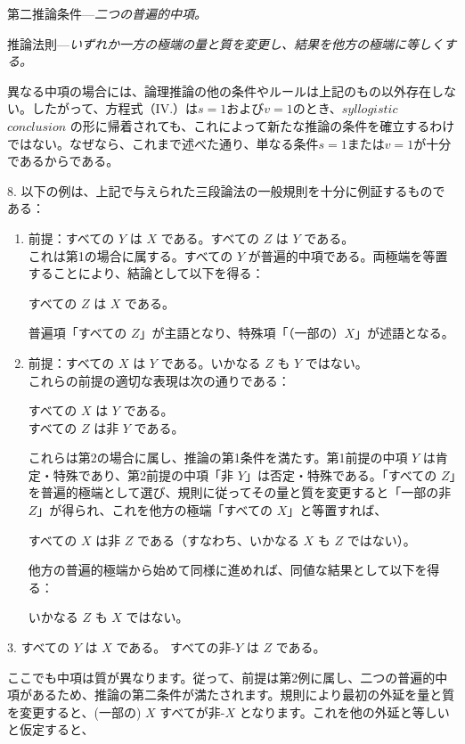 \documentclass[a4paper,11pt,openany]{ltjsbook}
\begin{document}
\textsc{第二推論条件}---\emph{二つの普遍的中項。}

\textsc{推論法則}---\emph{いずれか一方の極端の量と質を変更し、結果を他方の極端に等しくする。}

異なる中項の場合には、論理推論の他の条件やルールは上記のもの以外存在しない。したがって、方程式（IV.）は$s=1$および$v = 1$のとき、$syllogistic$ $conclusion$ の形に帰着されても、これによって新たな推論の条件を確立するわけではない。なぜなら、これまで述べた通り、単なる条件$s = 1$または$v = 1$が十分であるからである。

8. 以下の例は、上記で与えられた三段論法の一般規則を十分に例証するものである：
\begin{enumerate}[label=\textbf{\arabic*.}]
\item 前提：すべての $Y$ は $X$ である。すべての $Z$ は $Y$ である。\\
これは第1の場合に属する。すべての $Y$ が普遍的中項である。両極端を等置することにより、結論として以下を得る：
\begin{center}
すべての $Z$ は $X$ である。
\end{center}
普遍項「すべての $Z$」が主語となり、特殊項「（一部の）$X$」が述語となる。

\item 前提：すべての $X$ は $Y$ である。いかなる $Z$ も $Y$ ではない。\\
これらの前提の適切な表現は次の通りである：
\begin{center}
すべての $X$ は $Y$ である。\\
すべての $Z$ は非 $Y$ である。
\end{center}
これらは第2の場合に属し、推論の第1条件を満たす。第1前提の中項 $Y$ は肯定・特殊であり、第2前提の中項「非 $Y$」は否定・特殊である。「すべての $Z$」を普遍的極端として選び、規則に従ってその量と質を変更すると「一部の非 $Z$」が得られ、これを他方の極端「すべての $X$」と等置すれば、
\begin{center}
すべての $X$ は非 $Z$ である（すなわち、いかなる $X$ も $Z$ ではない）。
\end{center}
他方の普遍的極端から始めて同様に進めれば、同値な結果として以下を得る：
\begin{center}
いかなる $Z$ も $X$ ではない。
\end{center}
\end{enumerate}

3. すべての $Y$ は $X$ である。
   すべての非-$Y$ は $Z$ である。

ここでも中項は質が異なります。従って、前提は第2例に属し、二つの普遍的中項があるため、推論の第二条件が満たされます。規則により最初の外延を量と質を変更すると、(一部の) $X$ すべてが非-$X$ となります。これを他の外延と等しいと仮定すると、
\end{document}
